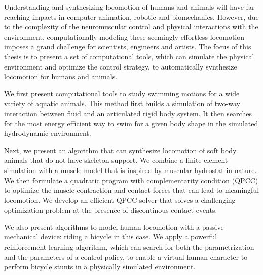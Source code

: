 Understanding and synthesizing locomotion of humans and animals will have far-reaching impacts in computer animation, robotic and biomechanics. However, due to the complexity of the neuromuscular control and physical interactions with the environment, computationally modeling these seemingly effortless locomotion imposes a grand challenge for scientists, engineers and artists. The focus of this thesis is to present a set of computational tools, which can simulate the physical environment and optimize the control strategy, to automatically synthesize locomotion for humans and animals.

We first present computational tools to study swimming motions for a wide variety of aquatic animals. This method first builds a simulation of two-way interaction between fluid and an articulated rigid body system. It then searches for the most energy efficient way to swim for a given body shape in the simulated hydrodynamic environment.

Next, we present an algorithm that can synthesize locomotion of soft body animals that do not have skeleton support. We combine a finite element simulation with a muscle model that is inspired by muscular hydrostat in nature. We then formulate a quadratic program with complementarity condition (QPCC) to optimize the muscle contraction and contact forces that can lead to meaningful locomotion. We develop an efficient QPCC solver that solves a challenging optimization problem at the presence of discontinous contact events.

We also present algorithms to model human locomotion with a passive mechanical device: riding a bicycle in this case. We apply a powerful reinforcement learning algorithm, which can search for both the parametrization and the parameters of a control policy, to enable a virtual human character to perform bicycle stunts in a physically simulated environment.

